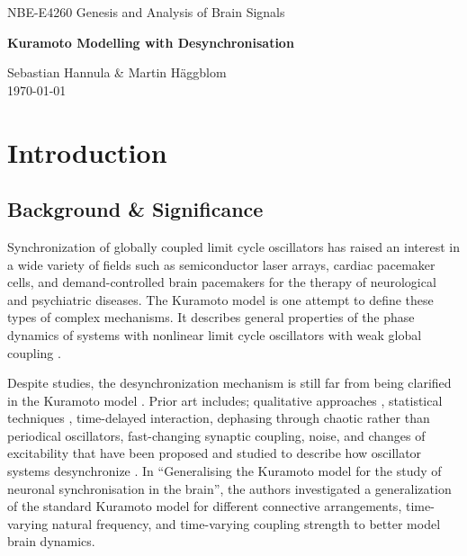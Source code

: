 \documentclass{article}
\begin{document}
\begin{center}
    \vspace*{4cm}
    
    \large NBE-E4260 Genesis and Analysis of Brain Signals \\
    \vspace{0.5cm}
    
    \LARGE\textbf{Kuramoto Modelling with Desynchronisation}  \\
        
    \vspace{4cm}

    \large Sebastian Hannula \& Martin Häggblom\\

    \today
    
\end{center}
\thispagestyle{empty}
\newpage
\tableofcontents
\newpage
\setcounter{page}{1}

\section{Introduction}

\subsection{Background \& Significance}
Synchronization of globally coupled limit cycle oscillators has raised an interest in a wide variety of fields such as semiconductor laser arrays, cardiac pacemaker cells, and demand-controlled brain pacemakers for the therapy of neurological and psychiatric diseases. The Kuramoto model is one attempt to define these types of complex mechanisms. It describes general properties of the phase dynamics of systems with nonlinear limit cycle oscillators with weak global coupling \cite{Maistrenko}.

Despite studies, the desynchronization mechanism is still far from being clarified in the Kuramoto model \cite{Maistrenko}. Prior art includes; qualitative approaches \cite{Maistrenko}, statistical techniques \cite{Strogatz}, time-delayed interaction, dephasing through chaotic rather than periodical oscillators, fast-changing synaptic coupling, noise, and changes of excitability that have been proposed and studied to describe how oscillator systems desynchronize \cite{Han}. In “Generalising the Kuramoto model for the study of neuronal synchronisation in the brain”, \cite{Cumin} the authors investigated a generalization of the standard Kuramoto model for different connective arrangements, time-varying natural frequency, and time-varying coupling strength to better model brain dynamics.
\end{document}
